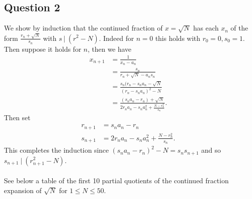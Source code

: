 \documentclass{article}
\begin{document}
\subsection{Question 2}
We show by induction that the continued fraction of $x=\sqrt{N}$ has each $x_n$ of the form $\frac{r_n+\sqrt{N}}{s_n}$ with $s\ |\ (r^2-N)$.  Indeed for $n=0$ this holds with $r_0=0, s_0=1$. Then suppose it holds for $n$,  then we have
\begin{align*}
		x_{n+1}&=\frac{1}{x_n-a_n}\\
				    &=\frac{s_n}{r_n+\sqrt{N}-a_ns_n}\\
				    &=\frac{s_n(r_n-s_na_n-\sqrt{N}}{(r_n-s_na_n)^2-N}\\
				    &=\frac{(s_na_n-r_n)+\sqrt{N}}{2r_na_n-s_na_n^2+\frac{N-r_n^2}{s_n}}.
\end{align*}
Then set 
\begin{align*}
	r_{n+1}&=s_na_n-r_n\\
	s_{n+1}&=2r_na_n-s_na_n^2+\frac{N-r_n^2}{s_n}.
\end{align*}
This completes the induction since $(s_na_n-r_n)^2-N=s_ns_{n+1}$ and so $s_{n+1}\ |\ (r^2_{n+1}-N)$.\\\\

See below a table of the first 10 partial quotients of the continued fraction expansion of $\sqrt{N}$ for $1\le N\le 50$.
\end{document}
